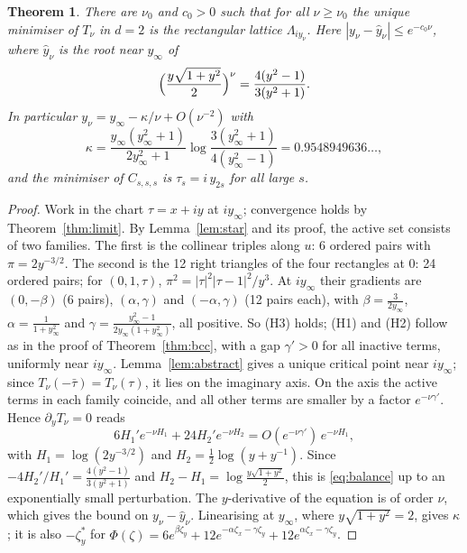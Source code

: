 \documentclass[10pt,twocolumn,a4paper]{article}
\newtheorem{theorem}{Theorem}
\theoremstyle{definition}
\begin{document}
\begin{theorem}\label{thm:rect}
There are $\nu_0$ and $c_0>0$ such that for all $\nu\ge\nu_0$ the unique minimiser of $T_\nu$ in $d=2$ is the rectangular lattice $\Lambda_{iy_\nu}$. Here $|y_\nu-\hat y_\nu|\le e^{-c_0\nu}$, where $\hat y_\nu$ is the root near $y_\infty$ of
\begin{equation}\label{eq:balance}
\Bigl(\frac{y\sqrt{1+y^2}}{2}\Bigr)^{\nu}=\frac{4(y^2-1)}{3(y^2+1)} .
\end{equation}
In particular $y_\nu=y_\infty-\kappa/\nu+O(\nu^{-2})$ with
\[\kappa=\frac{y_\infty(y_\infty^2+1)}{2y_\infty^2+1}\log\frac{3(y_\infty^2+1)}{4(y_\infty^2-1)}=0.9548949636\ldots,\]
and the minimiser of $C_{s,s,s}$ is $\tau_s=i\,y_{2s}$ for all large $s$.
\end{theorem}
\begin{proof}
Work in the chart $\tau=x+iy$ at $iy_\infty$; convergence holds by Theorem~\ref{thm:limit}. By Lemma~\ref{lem:star} and its proof, the active set consists of two families. The first is the collinear triples along $u$: 6 ordered pairs with $\pi=2y^{-3/2}$. The second is the 12 right triangles of the four rectangles at $0$: 24 ordered pairs; for $(0,1,\tau)$, $\pi^2=|\tau|^2|\tau-1|^2/y^3$. At $iy_\infty$ their gradients are $(0,-\beta)$ (6 pairs), $(\alpha,\gamma)$ and $(-\alpha,\gamma)$ (12 pairs each), with $\beta=\frac3{2y_\infty}$, $\alpha=\frac1{1+y_\infty^2}$ and $\gamma=\frac{y_\infty^2-1}{2y_\infty(1+y_\infty^2)}$, all positive. So (H3) holds; (H1) and (H2) follow as in the proof of Theorem~\ref{thm:bcc}, with a gap $\gamma'>0$ for all inactive terms, uniformly near $iy_\infty$. Lemma~\ref{lem:abstract} gives a unique critical point near $iy_\infty$; since $T_\nu(-\bar\tau)=T_\nu(\tau)$, it lies on the imaginary axis. On the axis the active terms in each family coincide, and all other terms are smaller by a factor $e^{-\nu\gamma'}$. Hence $\partial_yT_\nu=0$ reads
\[6H_1'e^{-\nu H_1}+24H_2'e^{-\nu H_2}=O(e^{-\nu\gamma'})\,e^{-\nu H_1},\]
with $H_1=\log(2y^{-3/2})$ and $H_2=\frac12\log(y+y^{-1})$. Since $-4H_2'/H_1'=\frac{4(y^2-1)}{3(y^2+1)}$ and $H_2-H_1=\log\frac{y\sqrt{1+y^2}}2$, this is \eqref{eq:balance} up to an exponentially small perturbation. The $y$-derivative of the equation is of order $\nu$, which gives the bound on $y_\nu-\hat y_\nu$. Linearising at $y_\infty$, where $y\sqrt{1+y^2}=2$, gives $\kappa$; it is also $-\zeta^*_y$ for $\Phi(\zeta)=6e^{\beta\zeta_y}+12e^{-\alpha\zeta_x-\gamma\zeta_y}+12e^{\alpha\zeta_x-\gamma\zeta_y}$.
\end{proof}
\end{document}
